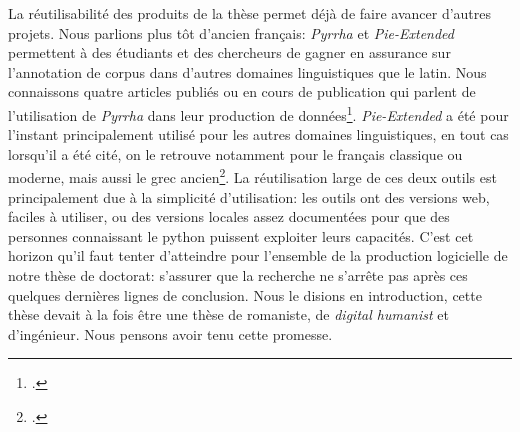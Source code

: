 La réutilisabilité des produits de la thèse permet déjà de faire avancer d'autres projets. Nous parlions plus tôt d'ancien français: \textit{Pyrrha} et \textit{Pie-Extended} permettent à des étudiants et des chercheurs de gagner en assurance sur l'annotation de corpus dans d'autres domaines linguistiques que le latin. Nous connaissons quatre articles publiés ou en cours de publication qui parlent de l'utilisation de \textit{Pyrrha} dans leur production de données\footcite{ceresato_lanalisi_2021, meelen_old_2021,pyrrhachahan, camps:halshs-03353125}. \textit{Pie-Extended} a été pour l'instant principalement utilisé pour les autres domaines linguistiques, en tout cas lorsqu'il a été cité, on le retrouve notamment pour le français classique ou moderne, mais aussi le grec ancien\footcite{reboul:hal-03340641}. La réutilisation large de ces deux outils est principalement due à la simplicité d'utilisation: les outils ont des versions web, faciles à utiliser, ou des versions locales assez documentées pour que des personnes connaissant le python puissent exploiter leurs capacités. C'est cet horizon qu'il faut tenter d'atteindre pour l'ensemble de la production logicielle de notre thèse de doctorat: s'assurer que la recherche ne s'arrête pas après ces quelques dernières lignes de conclusion. Nous le disions en introduction, cette thèse devait à la fois être une thèse de romaniste, de \textit{digital humanist} et d'ingénieur. Nous pensons avoir tenu cette promesse.
